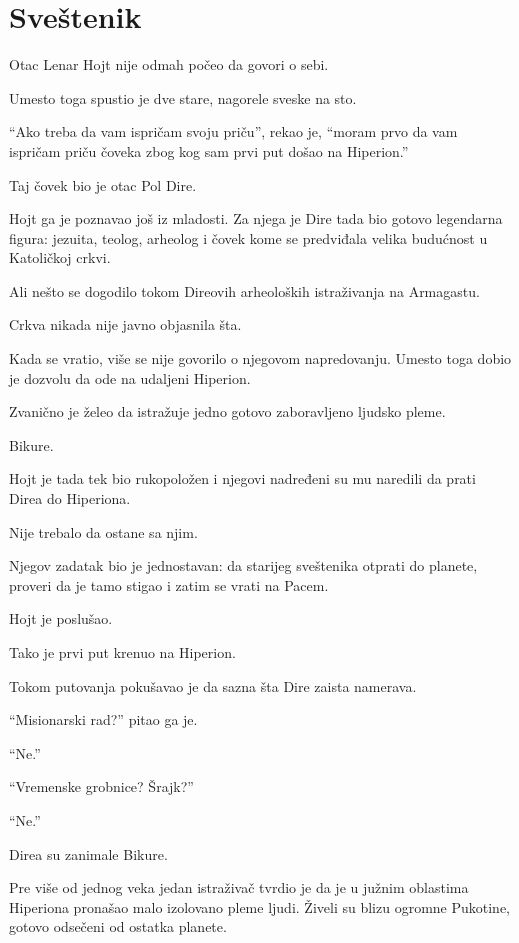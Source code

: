 \chapter{Sveštenik}


Otac Lenar Hojt nije odmah počeo da govori o sebi.

Umesto toga spustio je dve stare, nagorele sveske na sto.

``Ako treba da vam ispričam svoju priču'', rekao je, ``moram prvo da vam ispričam priču čoveka zbog kog sam prvi put došao na Hiperion.''

Taj čovek bio je otac Pol Dire.

Hojt ga je poznavao još iz mladosti. Za njega je Dire tada bio gotovo legendarna figura: jezuita, teolog, arheolog i čovek kome se predviđala velika budućnost u Katoličkoj crkvi.

Ali nešto se dogodilo tokom Direovih arheoloških istraživanja na Armagastu.

Crkva nikada nije javno objasnila šta.

Kada se vratio, više se nije govorilo o njegovom napredovanju. Umesto toga dobio je dozvolu da ode na udaljeni Hiperion.

Zvanično je želeo da istražuje jedno gotovo zaboravljeno ljudsko pleme.

Bikure.

Hojt je tada tek bio rukopoložen i njegovi nadređeni su mu naredili da prati Direa do Hiperiona.

Nije trebalo da ostane sa njim.

Njegov zadatak bio je jednostavan: da starijeg sveštenika otprati do planete, proveri da je tamo stigao i zatim se vrati na Pacem.

Hojt je poslušao.

Tako je prvi put krenuo na Hiperion.

Tokom putovanja pokušavao je da sazna šta Dire zaista namerava.

``Misionarski rad?'' pitao ga je.

``Ne.''

``Vremenske grobnice? Šrajk?''

``Ne.''

Direa su zanimale Bikure.

Pre više od jednog veka jedan istraživač tvrdio je da je u južnim oblastima Hiperiona pronašao malo izolovano pleme ljudi. Živeli su blizu ogromne Pukotine, gotovo odsečeni od ostatka planete.

